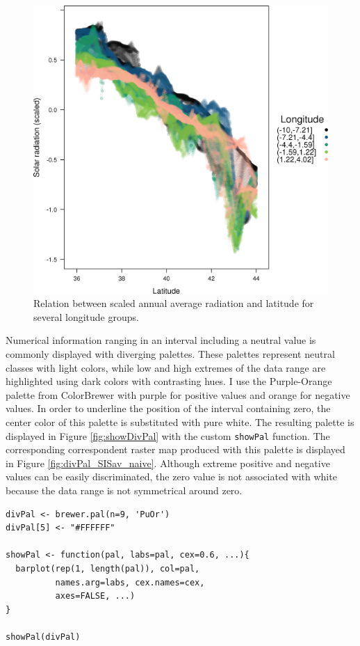\documentclass[smallroyalvopaper]{memoir}
\begin{document}
\begin{figure}[htb]
\centering
\includegraphics[width=.9\linewidth]{figs/xyplotSISav.png}
\caption{\label{fig:xyplotSISav}Relation between scaled annual average radiation and latitude for several longitude groups.}
\end{figure}

Numerical information ranging in an interval including a neutral
value is commonly displayed with diverging palettes. These
palettes represent neutral classes with light colors, while low
and high extremes of the data range are highlighted using dark
colors with contrasting hues. I use the Purple-Orange palette from
ColorBrewer with purple for positive values and orange for
negative values. In order to underline the position of the
interval containing zero, the center color of this palette is
substituted with pure white. The resulting palette is displayed in
Figure \ref{fig:showDivPal} with the custom \texttt{showPal}
function. The corresponding correspondent raster map produced with this palette
is displayed in Figure \ref{fig:divPal_SISav_naive}.  Although
extreme positive and negative values can be easily discriminated,
the zero value is not associated with white because the data range
is not symmetrical around zero.


\lstset{language=R,numbers=none}
\begin{lstlisting}
divPal <- brewer.pal(n=9, 'PuOr')
divPal[5] <- "#FFFFFF"

showPal <- function(pal, labs=pal, cex=0.6, ...){
  barplot(rep(1, length(pal)), col=pal,
          names.arg=labs, cex.names=cex,
          axes=FALSE, ...)
}

showPal(divPal)
\end{lstlisting}
\end{document}
